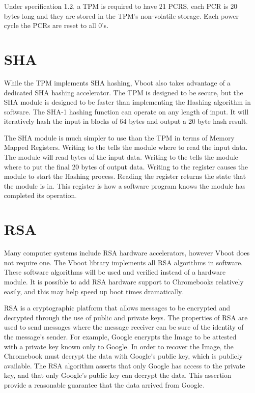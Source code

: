 Under specification 1.2, a TPM is required to have 21 PCRS, each PCR is 20 bytes
long and they are stored in the TPM's non-volatile storage.
Each power cycle the PCRs are reset to all 0's.


\section{SHA}

While the TPM implements SHA hashing, Vboot also takes advantage of a dedicated
SHA hashing accelerator. 
The TPM is designed to be secure, but the SHA module is designed to be faster
than implementing the Hashing algorithm in software.
The SHA-1 hashing function can operate on any length of input.
It will iteratively hash the input in blocks of 64 bytes and output a 20 byte
hash result.


The SHA module is much simpler to use than the TPM in terms of Memory Mapped
Registers. 
Writing to the  tells the module where to read the input data.
The module will read  bytes of the input data.
Writing to the  tells the module where to put the final 20
bytes of output data.
Writing to the   register causes the module to start the
Hashing process.
Reading the  register returns the state that the module is in.
This register is how a software program knows the module has completed its
operation.

\section{RSA}

Many computer systems include RSA hardware accelerators, however Vboot does not
require one. 
The Vboot library implements all RSA algorithms in software.
These software algorithms will be used and verified instead of a hardware
module.
It is possible to add RSA hardware support to Chromebooks relatively 
easily, and this may help speed up boot times dramatically.

RSA is a cryptographic platform that allows messages to be encrypted and
decrypted through the use of public and private keys.
The properties of RSA are used to send messages where the message 
receiver can be sure of the identity of the message's sender. 
For example, Google encrypts the Image to be attested with a private key known only to Google.
In order to recover the Image, the Chromebook must decrypt the data with Google's public key, which is publicly available. 
The RSA algorithm asserts that only Google has access to the private 
key, and that only Google's public key can decrypt the data.
This assertion provide a reasonable guarantee that the data arrived from Google.

